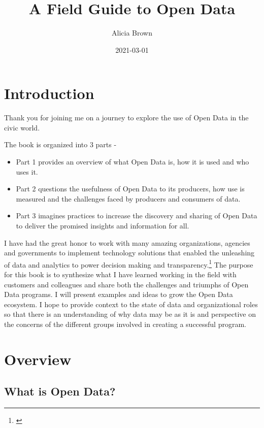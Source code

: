 \documentclass[
  openany]{book}
\title{A Field Guide to Open Data}
\author{Alicia Brown}
\date{2021-03-01}
\providecommand{\tightlist}{%
  \setlength{\itemsep}{0pt}\setlength{\parskip}{0pt}}
\begin{document}
\maketitle

{
\setcounter{tocdepth}{1}
\tableofcontents
}
\hypertarget{introduction}{%
\chapter{Introduction}\label{introduction}}

Thank you for joining me on a journey to explore the use of Open Data in the civic world.

The book is organized into 3 parts -

\begin{itemize}
\tightlist
\item
  Part 1 provides an overview of what Open Data is, how it is used and who uses it.
\item
  Part 2 questions the usefulness of Open Data to its producers, how use is measured and the challenges faced by producers and consumers of data.
\item
  Part 3 imagines practices to increase the discovery and sharing of Open Data to deliver the promised insights and information for all.
\end{itemize}

I have had the great honor to work with many amazing organizations, agencies and governments to implement technology solutions that enabled the unleashing of data and analytics to power decision making and transparency.\footnote{\citet{blog5years}} The purpose for this book is to synthesize what I have learned working in the field with customers and colleagues and share both the challenges and triumphs of Open Data programs. I will present examples and ideas to grow the Open Data ecosystem. I hope to provide context to the state of data and organizational roles so that there is an understanding of why data may be as it is and perspective on the concerns of the different groups involved in creating a successful program.

\hypertarget{overview}{%
\chapter{Overview}\label{overview}}

\hypertarget{what-is-open-data}{%
\section{What is Open Data?}\label{what-is-open-data}}
\end{document}
